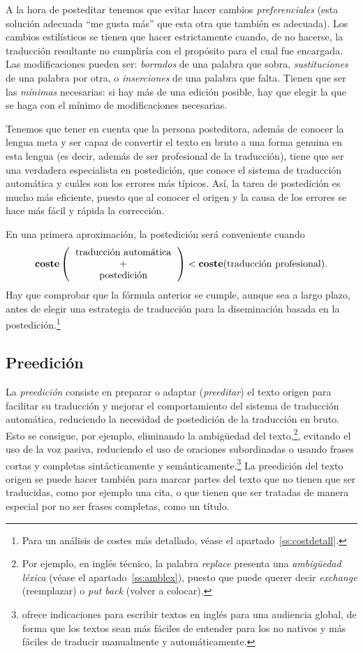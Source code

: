 A la hora de posteditar tenemos que evitar hacer cambios \emph{preferenciales} (esta solución adecuada ``me gusta más'' que esta otra que también es adecuada). Los cambios estilísticos se tienen que hacer estrictamente cuando, de no hacerse, la traducción resultante no cumpliría con el propósito para el cual fue encargada. Las modificaciones pueden ser: \emph{borrados} de una palabra que sobra, \emph{sustituciones} de una palabra por otra, o \emph{inserciones} de una palabra que falta. Tienen que ser las \emph{mínimas} necesarias: si hay más de una edición posible, hay que elegir la que se haga con el mínimo de modificaciones necesarias. 

Tenemos que tener en cuenta que la persona posteditora, además de conocer la lengua meta y ser capaz de convertir el texto en bruto a una forma genuina en esta lengua (es decir, además de ser profesional de la traducción), tiene que ser una verdadera especialista en postedición, que conoce el sistema de traducción automática y cuáles son los errores más típicos. Así, la tarea de postedición es mucho más eficiente, puesto que al conocer el origen y la causa de los errores se hace más fácil y rápida la corrección. 

En una primera aproximación, la postedición será conveniente cuando $$\textbf{coste}\left(\mbox{\begin{tabular}{c}traducción automática\\ +\\ postedición\end{tabular}}\right) < \textbf{coste}(\mbox{traducción profesional}). $$ \label{pg:cost} Hay que comprobar que la fórmula anterior se cumple, aunque sea a largo plazo, antes de elegir una estrategia de traducción para la diseminación basada en la postedición.\footnote{Para un análisis de costes más detallado, véase el apartado~\ref{ss:costdetall}.} 

\subsection{Preedición} \label{ss:preedicio} La \emph{preedición} consiste en preparar o adaptar (\emph{preeditar}) el texto origen para facilitar su traducción y mejorar el comportamiento del sistema de traducción automática, reduciendo la necesidad de postedición de la traducción en bruto. Esto se consigue, por ejemplo, eliminando la ambigüedad del texto,\footnote{Por ejemplo, en inglés técnico, la palabra \emph{replace} presenta una \emph{ambigüedad léxica} (véase el apartado~\ref{ss:amblex}), puesto que puede querer decir \emph{exchange} (reemplazar) o \emph{put back} (volver a colocar).}, evitando el uso de la voz pasiva, reduciendo el uso de oraciones subordinadas o usando frases cortas y completas sintácticamente y semánticamente.\footnote{\citet{kohl08} ofrece indicaciones para escribir textos en inglés para una audiencia global, de forma que los textos sean más fáciles de entender para los no nativos y más fáciles de traducir manualmente y automáticamente.} La preedición del texto origen se puede hacer también para marcar partes del texto que no tienen que ser traducidas, como por ejemplo una cita, o que tienen que ser tratadas de manera especial por no ser frases completas, como un título. 

